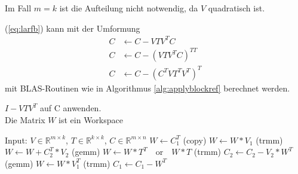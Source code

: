 Im Fall $ m = k $ ist die Aufteilung nicht notwendig, da $ V $ quadratisch ist.

(\ref{eq:larfb}) kann mit der Umformung
\begin{align*}
	C &\leftarrow  C - V T V^T C \\
	C &\leftarrow C - (V T V^T C)^{TT} 	\\
	C &\leftarrow  C - (C^T  V  T^T  V^T)^T
\end{align*}
mit BLAS-Routinen wie in Algorithmus \ref{alg:applyblockref} berechnet werden.

\begin{algorithm}[H]
	\caption{$I - V T V^T$ auf C anwenden.\\
			 Die Matrix $W$ ist ein Workspace}
	\label{alg:applyblockref}
	\begin{algorithmic}[1]
		\State Input: $V \in \mathbb{R}^{m \times k}$, $T \in \mathbb{R}^{k \times k}$, $C \in \mathbb{R}^{m \times n}$
		\State 	$W \leftarrow C_1^T$ (copy)
		\State	$W \leftarrow W * V_1 $ (trmm)
			\State $W \leftarrow W + C_2^T*V_2$ (gemm)
		\EndIf
		\State 	$ W \leftarrow W * T^T \quad \text{or}\quad  W * T$ (trmm)
			\State $C_2 \leftarrow C_2 - V_2 * W^T$ (gemm)
		\EndIf
		\State 	$ W \leftarrow W * V_1^T $ (trmm)
		\State 	$ C_1 \leftarrow C_1 - W^T $
	\end{algorithmic}
\end{algorithm}


